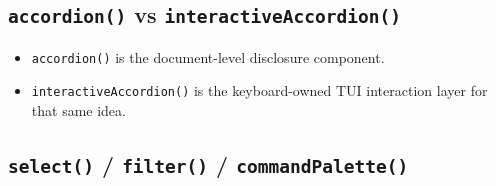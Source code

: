 \subsection{\texorpdfstring{\texttt{a\allowbreak{}c\allowbreak{}c\allowbreak{}o\allowbreak{}r\allowbreak{}d\allowbreak{}i\allowbreak{}o\allowbreak{}n\allowbreak{}(\allowbreak{})} vs \texttt{i\allowbreak{}n\allowbreak{}t\allowbreak{}e\allowbreak{}r\allowbreak{}a\allowbreak{}c\allowbreak{}t\allowbreak{}i\allowbreak{}v\allowbreak{}e\allowbreak{}A\allowbreak{}c\allowbreak{}c\allowbreak{}o\allowbreak{}r\allowbreak{}d\allowbreak{}i\allowbreak{}o\allowbreak{}n\allowbreak{}(\allowbreak{})}}{ vs }}\label{record-425-accordion-vs-interactiveaccordion}

\begin{itemize}
\tightlist
\item
  \texttt{a\allowbreak{}c\allowbreak{}c\allowbreak{}o\allowbreak{}r\allowbreak{}d\allowbreak{}i\allowbreak{}o\allowbreak{}n\allowbreak{}(\allowbreak{})} is the document-level disclosure component.
\item
  \texttt{i\allowbreak{}n\allowbreak{}t\allowbreak{}e\allowbreak{}r\allowbreak{}a\allowbreak{}c\allowbreak{}t\allowbreak{}i\allowbreak{}v\allowbreak{}e\allowbreak{}A\allowbreak{}c\allowbreak{}c\allowbreak{}o\allowbreak{}r\allowbreak{}d\allowbreak{}i\allowbreak{}o\allowbreak{}n\allowbreak{}(\allowbreak{})} is the keyboard-owned TUI interaction layer for that same idea.
\end{itemize}

\subsection{\texorpdfstring{\texttt{s\allowbreak{}e\allowbreak{}l\allowbreak{}e\allowbreak{}c\allowbreak{}t\allowbreak{}(\allowbreak{})} / \texttt{f\allowbreak{}i\allowbreak{}l\allowbreak{}t\allowbreak{}e\allowbreak{}r\allowbreak{}(\allowbreak{})} / \texttt{c\allowbreak{}o\allowbreak{}m\allowbreak{}m\allowbreak{}a\allowbreak{}n\allowbreak{}d\allowbreak{}P\allowbreak{}a\allowbreak{}l\allowbreak{}e\allowbreak{}t\allowbreak{}t\allowbreak{}e\allowbreak{}(\allowbreak{})}}{ /  / }}\label{record-425-select-filter-commandpalette}

